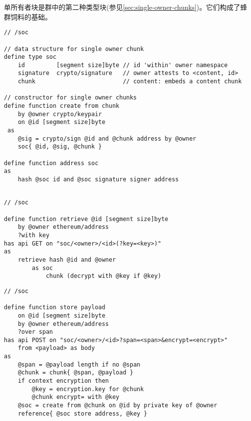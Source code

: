 单所有者块是群中的第二种类型块(参见\ref{sec:single-owner-chunks})。它们构成了蜂群饲料的基础。


\begin{definition}\label{def:soc}
\begin{lstlisting}[language=buzz1]
// /soc

// data structure for single owner chunk
define type soc 
    id         [segment size]byte // id 'within' owner namespace
    signature  crypto/signature   // owner attests to <content, id> 
    chunk                         // content: embeds a content chunk

// constructor for single owner chunks
define function create from chunk 
    by @owner crypto/keypair
    on @id [segment size]byte
 as
    @sig = crypto/sign @id and @chunk address by @owner
    soc{ @id, @sig, @chunk }

define function address soc
as
    hash @soc id and @soc signature signer address
    
\end{lstlisting}
\end{definition}

\begin{definition}\label{def:soc-retrieve}
\begin{lstlisting}[language=buzz1]
// /soc

define function retrieve @id [segment size]byte
    by @owner ethereum/address
    ?with key
has api GET on "soc/<owner>/<id>(?key=<key>)"
as
    retrieve hash @id and @owner 
        as soc
            chunk (decrypt with @key if @key)
\end{lstlisting}
\end{definition}


\begin{definition}\label{def:soc-store}
\begin{lstlisting}[language=buzz1]
// /soc

define function store payload
    on @id [segment size]byte
    by @owner ethereum/address 
    ?over span
has api POST on "soc/<owner>/<id>?span=<span>&encrypt=<encrypt>"
    from <payload> as body
as 
    @span = @payload length if no @span
    @chunk = chunk{ @span, @payload }
    if context encryption then
        @key = encryption.key for @chunk 
        @chunk encrypt= with @key
    @soc = create from @chunk on @id by private key of @owner
    reference{ @soc store address, @key }
             
\end{lstlisting}
\end{definition}
